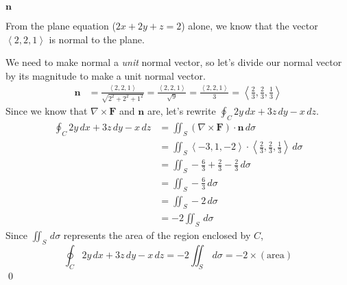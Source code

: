\documentclass{article}
\newcommand{\lrp}[1]{\left( #1 \right)}
\newcommand{\lra}[1]{\left\langle #1 \right\rangle}
\newcommand{\F}[0]{\mathbf{F}}
\newcommand{\n}[0]{\mathbf{n}}
\begin{document}
{}$\n$

From the plane equation ($2x+2y+z=2$) alone, we know that the vector $\lra{2,2,1}$ is normal to the plane.

We need to make normal a \textit{unit} normal vector, so let's divide our normal vector by its magnitude to make a unit normal vector.
\begin{align*}
    \n &= \frac{\lra{2,2,1}}{\sqrt{2^2+2^2+1^2}}=\frac{\lra{2,2,1}}{\sqrt{9}}=\frac{\lra{2,2,1}}{3}=\lra{\frac{2}{3},\frac{2}{3},\frac{1}{3}}
\end{align*}
Since we know that $\nabla \times \F$ and $\n$ are, let's rewrite $\displaystyle \oint_C 2y\,dx+3z\,dy-x\,dz$.
\begin{align*}
   \oint_C 2y\,dx+3z\,dy-x\,dz&=\iint_S\lrp{\nabla \times \F}\cdot \n \,d\sigma\\ &=\iint_S \lra{-3,1,-2}\cdot \lra{\frac{2}{3},\frac{2}{3},\frac{1}{3}}\,d\sigma\\
    &=\iint_S -\frac{6}{3}+\frac{2}{3}-\frac{2}{3}\,d\sigma\\
    &=\iint_S -\frac{6}{3}\,d\sigma\\
    &=\iint_S -2\,d\sigma\\
    &=-2\iint_S \,d\sigma\tag{we can take constants out}
\end{align*}
Since $\displaystyle \iint_S \,d\sigma$ represents the area of the region enclosed by $C$,
\begin{equation*}
    \oint_C 2y\,dx+3z\,dy-x\,dz=-2\iint_S \,d\sigma=-2\times \lrp{\text{area}}
\end{equation*}
\qed
\end{document}
